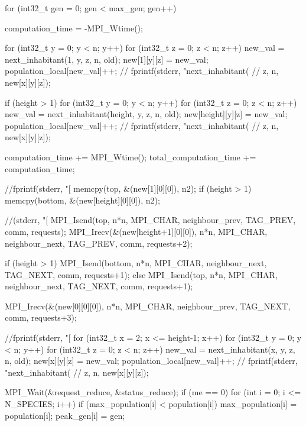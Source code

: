 \documentclass{article}
\begin{document}
    for (int32_t gen = 0; gen < max_gen; gen++) {
      computation_time = -MPI_Wtime();

        for (int32_t y = 0; y < n; y++) {
          for (int32_t z = 0; z < n; z++) {
            new_val = next_inhabitant(1, y, z, n, old);
            new[1][y][z] = new_val;
            population_local[new_val]++;
            // fprintf(stderr, "next_inhabitant(%
            //         z, n, new[x][y][z]);
          }
        }

        if (height > 1) {
        for (int32_t y = 0; y < n; y++) {
          for (int32_t z = 0; z < n; z++) {
            new_val = next_inhabitant(height, y, z, n, old);
            new[height][y][z] = new_val;
            population_local[new_val]++;
            // fprintf(stderr, "next_inhabitant(%
            //         z, n, new[x][y][z]);
          }
        }
        }

      computation_time += MPI_Wtime();
      total_computation_time += computation_time;

          //fprintf(stderr, "[%
        memcpy(top, &(new[1][0][0]), n2);
        if (height > 1) memcpy(bottom, &(new[height][0][0]), n2);

        //(stderr, "[%
        MPI_Isend(top, n*n, MPI_CHAR, neighbour_prev, TAG_PREV, comm, requests);
        MPI_Irecv(&(new[height+1][0][0]), n*n, MPI_CHAR, neighbour_next, TAG_PREV, comm, requests+2);

        if (height > 1) MPI_Isend(bottom, n*n, MPI_CHAR, neighbour_next, TAG_NEXT, comm, requests+1);
        else MPI_Isend(top, n*n, MPI_CHAR, neighbour_next, TAG_NEXT, comm, requests+1);

        MPI_Irecv(&(new[0][0][0]), n*n, MPI_CHAR, neighbour_prev, TAG_NEXT, comm, requests+3);

        //fprintf(stderr, "[%
      for (int32_t x = 2; x <= height-1; x++) {
        for (int32_t y = 0; y < n; y++) {
          for (int32_t z = 0; z < n; z++) {
            new_val = next_inhabitant(x, y, z, n, old);
            new[x][y][z] = new_val;
            population_local[new_val]++;
            // fprintf(stderr, "next_inhabitant(%
            //         z, n, new[x][y][z]);
          }
        }
      }

        MPI_Wait(&request_reduce, &status_reduce);
        if (me == 0) {
          for (int i = 0; i <= N_SPECIES; i++) {
            if (max_population[i] < population[i]) {
              max_population[i] = population[i];
              peak_gen[i] = gen;
            }
          }
        }

}
\end{document}
